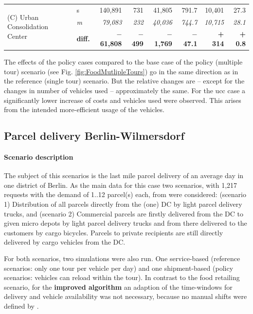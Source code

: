 \begin{table}[b]
\begin{tabular*}{\hsize}{@{\extracolsep{\fill}}llrrrrrr@{}}
\multirow{ 3}{150pt}{(C) Urban Consolidation Center} & s & 140,891 &  731 & 41,805 & 791.7 & 10,401 & 27.3\\
& \textit{m} & \textit{79,083} & \textit{232} & \textit{40,036} & \textit{744.7} & \textit{10,715} & \textit{28.1}\\ 
& \textbf{diff.} & \textbf{$-$ 61,808} & \textbf{$-$ 499} &  \textbf{$-$ 1,769} &  \textbf{$-$ 47.1} & \textbf{+ 314} & \textbf{+ 0.8}\\
\bottomrule

\end{tabular*}
\label{tab:BerlinFoodSinglevsMultiToursData}
\end{table}

The effects of the policy cases compared to the base case of the policy (multiple tour) scenario (see Fig. \ref{fig:FoodMutlipleTours}) go in the same direction as in the reference (single tour) scenario. But the relative changes are -- except for the changes in number of vehicles used -- approximately the same. For the \gls{ucc} case a significantly lower increase of costs and vehicles used were observed. This arises from the intended more-efficient usage of the vehicles.

\subsection{Parcel delivery Berlin-Wilmersdorf}
\label{sec:el-shipments-kep}
\nopagebreak
\paragraph*{Scenario description}
The subject of this scenarios is the last mile parcel delivery of an average day in one district of Berlin. 
As the main data for this case two scenarios, with 1,217 requests with the demand of 1..12 parcel(s) each, from \citet{ZhangEtAl2018UrbanParcelDelivery} were considered:
(scenario 1) Distribution of all parcels directly from the (one) \gls{DC} by light parcel delivery trucks, and
(scenario 2) Commercial parcels are firstly delivered from the \gls{DC} to given micro depots by light parcel delivery trucks and from there delivered to the customers by cargo bicycles. Parcels to private recipients are still directly delivered by cargo vehicles from the DC.

For both scenarios, two simulations were also run. One service-based (reference scenarios: only one tour per vehicle per day) and one shipment-based (policy scenarios: vehicles can reload within the tour). In contrast to the food retailing scenario, for the \textbf{improved algorithm} an adaption of the time-windows for delivery and vehicle availability was not necessary, because no manual shifts were defined by \citet{ZhangEtAl2018UrbanParcelDelivery}. 

